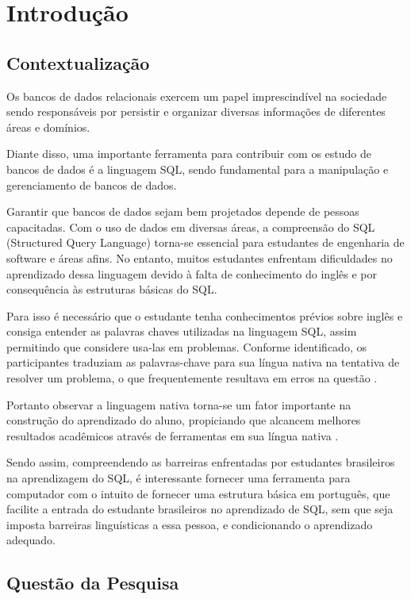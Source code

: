 
\chapter[Introdução]{Introdução}
\label{sec:Introducao}

\section{Contextualização}

Os bancos de dados relacionais exercem um papel imprescindível na sociedade
sendo responsáveis por persistir e organizar diversas informações de diferentes
áreas e domínios.

Diante disso, uma importante ferramenta para contribuir com os estudo de bancos
de dados é a linguagem SQL, sendo fundamental para a manipulação e
gerenciamento de bancos de dados.

Garantir que bancos de dados sejam bem projetados depende de pessoas
capacitadas. Com o uso de dados em diversas áreas, a compreensão do SQL
(Structured Query Language) torna-se essencial para estudantes de engenharia de
software e áreas afins. No entanto, muitos estudantes enfrentam dificuldades no
aprendizado dessa linguagem devido à falta de conhecimento do inglês e por
consequência às estruturas básicas do SQL.

Para isso é necessário que o estudante tenha conhecimentos prévios sobre inglês
e consiga entender as palavras chaves utilizadas na linguagem SQL, assim
permitindo que considere usa-las em problemas. Conforme identificado, os
participantes traduziam as palavras-chave para sua língua nativa na tentativa
de resolver um problema, o que frequentemente resultava em erros na questão
\cite{Miedema2021}.

Portanto observar a linguagem nativa torna-se um fator importante na construção
do aprendizado do aluno, propiciando que alcancem melhores resultados
acadêmicos através de ferramentas em sua língua nativa \cite{Silva2020}.

Sendo assim, compreendendo as barreiras enfrentadas por estudantes brasileiros
na aprendizagem do SQL, é interessante fornecer uma ferramenta para computador
com o intuito de fornecer uma estrutura básica em português, que facilite a
entrada do estudante brasileiros no aprendizado de SQL, sem que seja imposta
barreiras linguísticas a essa pessoa, e condicionando o aprendizado adequado.

\section{Questão da Pesquisa}

